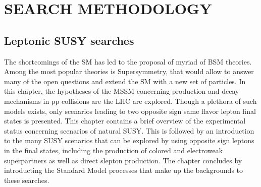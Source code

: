 \part{SEARCH METHODOLOGY}
\chapter{Leptonic SUSY searches} \label{search}
\noindent
\justify
The shortcomings of the SM has led to the proposal of myriad of BSM theories. 
Among the most popular theories is Supersymmetry, that would allow to answer many of the open questions and extend the SM with a new set of particles.
In this chapter, the hypotheses of the MSSM concerning production and decay mechanisms in pp collisions are the LHC are explored. 
Though a plethora of such models exists, only scenarios leading to two opposite sign same flavor lepton final states is presented. 
This chapter contains a brief overview of the experimental status concerning scenarios of natural SUSY. 
This is followed by an introduction to the many SUSY scenarios that can be explored by using opposite sign leptons in the final states, including the production of colored and electroweak superpartners as well as direct slepton production. 
The chapter concludes by introducting the Standard Model processes that make up the backgrounds to these searches. 
\newpage
